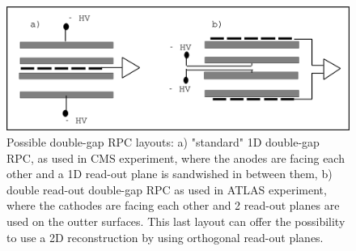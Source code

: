 	\begin{figure}[H]
		\centering
		\includegraphics[width = \plotwidth]{fig/chapt4/Double_gap_layouts.pdf}
		\caption{\label{fig:DGLayout} Possible double-gap RPC layouts: a) "standard" 1D double-gap RPC, as used in CMS experiment, where the anodes are facing each other and a 1D read-out plane is sandwished in between them,  b) double read-out double-gap RPC as used in ATLAS experiment, where the cathodes are facing each other and 2 read-out planes are used on the outter surfaces. This last layout can offer the possibility to use a 2D reconstruction by using orthogonal read-out planes.}
	\end{figure}
	
